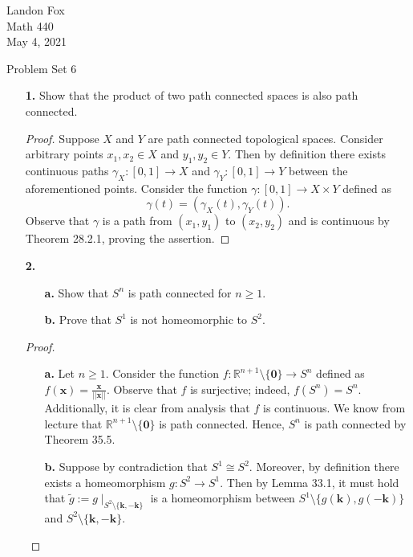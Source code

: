 \documentclass[ 12pt ]{article}
\begin{document}
\noindent Landon Fox \\
\noindent Math 440 \\
\noindent May 4, 2021

\begin{center}
	\Large Problem Set 6
\end{center}

\begin{enumerate}
	\item[\textbf{1.}] Show that the product of two path connected spaces is also path connected.

		\begin{proof}
			Suppose $X$ and $Y$ are path connected topological spaces. Consider arbitrary points $x_1, x_2 \in X$ and $y_1, y_2 \in Y$. Then by definition there exists continuous paths
			$\gamma_X : [0, 1] \to X$ and $\gamma_Y : [0, 1] \to Y$ between the aforementioned points. Consider the function $\gamma : [0, 1] \to X \times Y$ defined as $$\gamma(t) =
			\left ( \gamma_X(t), \gamma_Y(t) \right ).$$ Observe that $\gamma$ is a path from $(x_1, y_1)$ to $(x_2, y_2)$ and is continuous by Theorem 28.2.1, proving the assertion.
		\end{proof}


	\item[\textbf{2.}]
		\begin{enumerate}
			\item[\textbf{a.}] Show that $S^n$ is path connected for $n \geq 1$.
			\item[\textbf{b.}] Prove that $S^1$ is not homeomorphic to $S^2$.
		\end{enumerate}

		\begin{proof} $ $
			\begin{enumerate}
				\item[\textbf{a.}] Let $n \geq 1$. Consider the function $f : \mathbb{R}^{n+1} \setminus \{ \textbf{0} \} \to S^n$ defined as $f( \textbf{x} ) = \frac{\mathbf{x}}{||
					\textbf{x}||}$. Observe that $f$ is surjective; indeed, $f(S^n) = S^n$. Additionally, it is clear from analysis that $f$ is continuous. We know from lecture that
					$\mathbb{R}^{n+1} \setminus \{ \textbf{0} \}$ is path connected. Hence, $S^n$ is path connected by Theorem 35.5.

				\item[\textbf{b.}] Suppose by contradiction that $S^1 \cong S^2$. Moreover, by definition there exists a homeomorphism $g : S^2 \to S^1$. Then by Lemma 33.1, it must hold
					that $\widetilde{g} := g \mid_{S^2 \setminus \{ \textbf{k}, -\textbf{k} \}}$ is a homeomorphism between $S^1 \setminus \{ g(\textbf{k}), g(-\textbf{k}) \}$ and
					$S^2 \setminus \{ \textbf{k}, -\textbf{k} \}$. \\


\end{enumerate}
\end{proof}
\end{enumerate}
\end{document}
